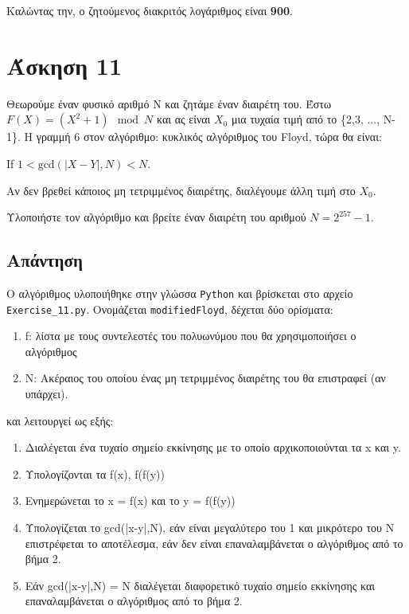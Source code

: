 \documentclass[12pt]{article}
\begin{document}
Καλώντας την, ο ζητούμενος διακριτός λογάριθμος είναι \textbf{900}.

\hfill \blacksquare

\section*{Άσκηση 11}

Θεωρούμε έναν φυσικό αριθμό N και ζητάμε έναν διαιρέτη του. Έστω \( F(X) = (X^2 +1)\mod{N} \) και ας είναι \( X_0 \) μια τυχαία τιμή από το \{2,3, ..., N-1\}. Η γραμμή 6 στον αλγόριθμο: κυκλικός αλγόριθμος του Floyd, τώρα θα είναι: 

\begin{center}
    If \( 1 < \text{gcd}(|X-Y|,N) < N \).
\end{center}
Αν δεν βρεθεί κάποιος μη τετριμμένος διαιρέτης, διαλέγουμε άλλη τιμή στο \( X_0\).

Υλοποιήστε τον αλγόριθμο και βρείτε έναν διαιρέτη του αριθμού \( N = 2^{257} - 1 \).
\subsection*{Απάντηση}

Ο αλγόριθμος υλοποιήθηκε στην γλώσσα \texttt{Python} και βρίσκεται στο αρχείο \texttt{Exercise\_11.py}. Ονομάζεται \texttt{modifiedFloyd}, δέχεται δύο ορίσματα: 
\begin{enumerate}
    \item f: λίστα με τους συντελεστές του πολυωνύμου που θα χρησιμοποιήσει ο αλγόριθμος
    \item N: Ακέραιος του οποίου ένας μη τετριμμένος διαιρέτης του θα επιστραφεί (αν υπάρχει).
\end{enumerate}
  και λειτουργεί ως εξής:
\begin{enumerate}
    
    \item Διαλέγεται ένα τυχαίο σημείο εκκίνησης με το οποίο αρχικοποιούνται τα x και y. 
    \item Υπολογίζονται τα f(x), f(f(y))
    \item Ενημερώνεται το x = f(x) και το y = f(f(y))
    \item Υπολογίζεται το gcd(|x-y|,N), εάν είναι μεγαλύτερο του 1 και μικρότερο του Ν επιστρέφεται το αποτέλεσμα, εάν δεν είναι επαναλαμβάνεται ο αλγόριθμος από το βήμα 2.
    \item Εάν gcd(|x-y|,N) = Ν διαλέγεται διαφορετικό τυχαίο σημείο εκκίνησης και επαναλαμβάνεται ο αλγόριθμος από το βήμα 2.
\end{enumerate}
\end{document}
